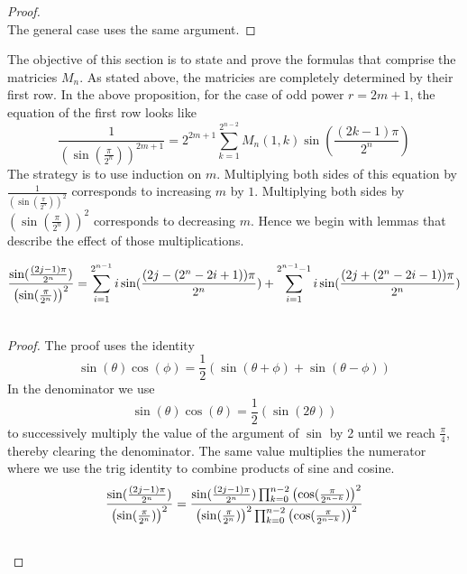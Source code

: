 \documentclass[fleqn,a4paper,9pt]{article}
\begin{document}
\begin{flushleft}
\begin{proof}
\begin{equation}
\end{equation}\notag
The general case uses the same argument.
\end{proof}
The objective of this section is to state and prove the formulas that comprise the matricies $M_n$. As stated above, the matricies are completely determined by their first row. In the above proposition, for the case of odd power $r=2m+1$, the equation of the first row looks like
$$\frac{1}{(\sin(\frac{\pi}{2^n}))^{2m+1}}=2^{2m+1} \sum_{k=1}^{2^{n-2}}M_n(1,k)\sin(\frac{(2k-1)\pi}{2^n})$$
The strategy is to use induction on $m$. Multiplying both sides of this equation by $\frac{1}{(\sin(\frac{\pi}{2^n}))^{2}}$ corresponds to increasing $m$ by $1$. Multiplying both sides by  $(\sin(\frac{\pi}{2^n}))^{2}$ corresponds to decreasing $m$. Hence we begin with lemmas that describe the effect of those multiplications.
\begin{lemma}\label{sinequotient}
\begin{align}
\frac{\sin(\frac{(2j-1)\pi}{2^n})}{\left(\sin(\frac{\pi}{2^n})\right)^2}&=\sum_{i=1}^{2^{n-1}}i\sin(\frac{(2j-(2^n-2i+1))\pi}{2^n})+\sum_{i=1}^{2^{n-1}-1}i\sin(\frac{(2j+(2^n-2i-1))\pi}{2^n})\\\notag
\end{align}
\end {lemma}
\begin{proof}
The proof uses the identity $$\sin(\theta)\cos(\phi)=\frac{1}{2}\left(\sin(\theta+\phi)+\sin(\theta-\phi)\right)$$
In the denominator we use
$$\sin(\theta)\cos(\theta)=\frac{1}{2}\left(\sin(2\theta)\right)$$
to successively multiply the value of the argument of $\sin$ by 2 until we reach $\frac{\pi}{4}$, thereby clearing the denominator. The same value multiplies the numerator where we use the trig identity to combine products of sine and cosine.
\begin{align}
\frac{\sin(\frac{(2j-1)\pi}{2^n})}{\left(\sin(\frac{\pi}{2^n})\right)^2}&=\frac{\sin(\frac{(2j-1)\pi}{2^n})\prod_{k=0}^{n-2}\left(\cos(\frac{\pi}{2^{n-k}})\right)^2 }{\left(\sin(\frac{\pi}{2^n})\right)^2\prod_{k=0}^{n-2}\left(\cos(\frac{\pi}{2^{n-k}})\right)^2}\\\notag
\end{align}


\end{proof}
\end{flushleft}
\end{document}
